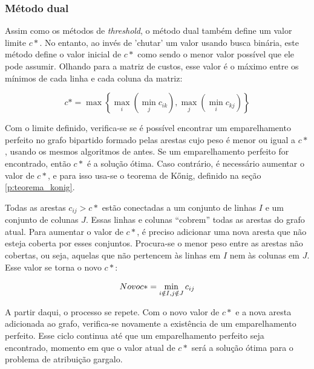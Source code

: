 \subsubsection{Método dual}

Assim como os métodos de \textit{threshold}, o método dual também define um valor limite $c\ast$. No entanto, ao invés de 'chutar' um valor usando busca binária, este método define o valor inicial de $c\ast$ como sendo o menor valor possível que ele pode assumir. Olhando para a matriz de custos, esse valor é o máximo entre os mínimos de cada linha e cada coluna da matriz:

\begin{equation}
    c\ast = \max \left\{ \max_{i} (\min_{j} c_{ik}), \max_{j} (\min_{i} c_{kj}) \right\}
\end{equation}

Com o limite definido, verifica-se se é possível encontrar um emparelhamento perfeito no grafo bipartido formado pelas arestas cujo peso é menor ou igual a $c\ast$, usando os mesmos algoritmos de antes. Se um emparelhamento perfeito for encontrado, então $c\ast$ é a solução ótima. Caso contrário, é necessário aumentar o valor de $c\ast$, e para isso usa-se o teorema de Kőnig, definido na seção \ref{p:teorema_konig}. 

Todas as arestas $c_{ij} > c\ast$ estão conectadas a um conjunto de linhas $I$ e um conjunto de colunas $J$. Essas linhas e colunas ``cobrem'' todas as arestas do grafo atual. Para aumentar o valor de $c\ast$, é preciso adicionar uma nova aresta que não esteja coberta por esses conjuntos. Procura-se o menor peso entre as arestas não cobertas, ou seja, aquelas que não pertencem às linhas em $I$ nem às colunas em $J$. Esse valor se torna o novo $c\ast$:

\begin{equation}
    Novo\space c\ast = \min_{i \notin I, j \notin J} c_{ij}
\end{equation}

A partir daqui, o processo se repete. Com o novo valor de $c\ast$ e a nova aresta adicionada ao grafo, verifica-se novamente a existência de um emparelhamento perfeito. Esse ciclo continua até que um emparelhamento perfeito seja encontrado, momento em que o valor atual de $c\ast$ será a solução ótima para o problema de atribuição gargalo.

